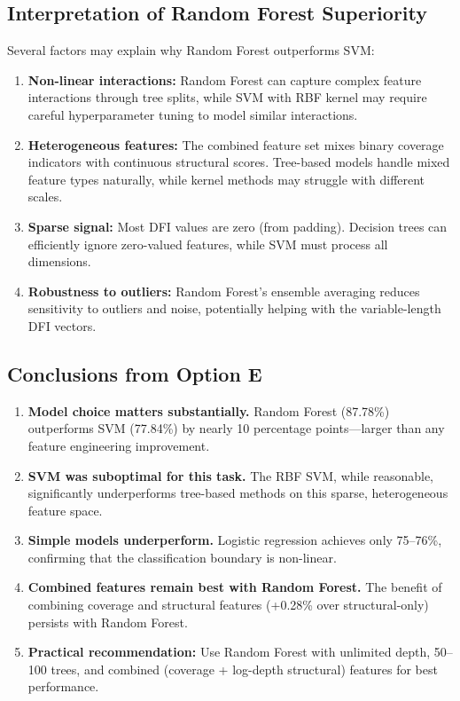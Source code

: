 \documentclass[12pt,a4paper]{article}
\begin{document}
\subsection{Interpretation of Random Forest Superiority}

Several factors may explain why Random Forest outperforms SVM:

\begin{enumerate}
\item \textbf{Non-linear interactions:} Random Forest can capture complex feature interactions
through tree splits, while SVM with RBF kernel may require careful hyperparameter tuning
to model similar interactions.

\item \textbf{Heterogeneous features:} The combined feature set mixes binary coverage indicators
with continuous structural scores. Tree-based models handle mixed feature types naturally,
while kernel methods may struggle with different scales.

\item \textbf{Sparse signal:} Most DFI values are zero (from padding). Decision trees can
efficiently ignore zero-valued features, while SVM must process all dimensions.

\item \textbf{Robustness to outliers:} Random Forest's ensemble averaging reduces sensitivity
to outliers and noise, potentially helping with the variable-length DFI vectors.
\end{enumerate}

\subsection{Conclusions from Option E}

\begin{enumerate}
\item \textbf{Model choice matters substantially.} Random Forest (87.78\%) outperforms
SVM (77.84\%) by nearly 10 percentage points---larger than any feature engineering improvement.

\item \textbf{SVM was suboptimal for this task.} The RBF SVM, while reasonable, significantly
underperforms tree-based methods on this sparse, heterogeneous feature space.

\item \textbf{Simple models underperform.} Logistic regression achieves only 75--76\%,
confirming that the classification boundary is non-linear.

\item \textbf{Combined features remain best with Random Forest.} The benefit of combining
coverage and structural features (+0.28\% over structural-only) persists with Random Forest.

\item \textbf{Practical recommendation:} Use Random Forest with unlimited depth, 50--100 trees,
and combined (coverage + log-depth structural) features for best performance.
\end{enumerate}
\end{document}
